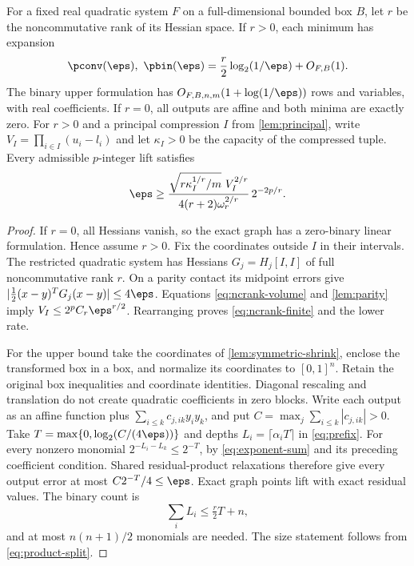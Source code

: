 \begin{theorem}\label{thm:ncrank}
For a fixed real quadratic system $F$ on a full-dimensional bounded
box $B$, let $r$ be the noncommutative rank of its Hessian space.
If $r>0$, each minimum has expansion
\begin{equation}\label{eq:ncrank-law}
 \pconv(\eps),\ \pbin(\eps)
   =\frac r2\log_2(1/\eps)+O_{F,B}(1).
\end{equation}
The binary upper formulation has
$O_{F,B,n,m}(1+\log(1/\eps))$ rows and variables, with real coefficients.
If $r=0$, all outputs are affine and both minima are exactly zero.
For $r>0$ and a principal compression $I$ from \cref{lem:principal}, write
$V_I=\prod_{i\in I}(u_i-l_i)$ and let $\kappa_I>0$ be the capacity of
the compressed tuple. Every admissible $p$-integer lift satisfies
\begin{equation}\label{eq:ncrank-finite}
 \eps\ge
 \frac{\sqrt{r\kappa_I^{1/r}/m}\ V_I^{2/r}}
      {4(r+2)\omega_r^{2/r}}\,2^{-2p/r}.
\end{equation}
\end{theorem}
\begin{proof}
If $r=0$, all Hessians vanish, so the exact graph has a zero-binary
linear formulation. Hence assume $r>0$.
Fix the coordinates outside $I$ in their intervals. The restricted
quadratic system has Hessians $G_j=H_j[I,I]$ of full noncommutative
rank $r$. On a parity contact its midpoint errors give
$|\tfrac12(x-y)^TG_j(x-y)|\le4\eps$. Equations
\eqref{eq:ncrank-volume} and \cref{lem:parity} imply
$V_I\le2^pC_r\eps^{r/2}$. Rearranging proves
\eqref{eq:ncrank-finite} and the lower rate.

For the upper bound take the coordinates of
\cref{lem:symmetric-shrink}, enclose the transformed box in a box,
and normalize its coordinates to $[0,1]^n$. Retain the original box
inequalities and coordinate identities. Diagonal rescaling and
translation do not create quadratic coefficients in zero blocks.
Write each output as an affine function plus
$\sum_{i\le k}c_{j,ik}y_iy_k$, and put
$C=\max_j\sum_{i\le k}|c_{j,ik}|>0$.
Take $T=\max\{0,\log_2(C/(4\eps))\}$ and depths
$L_i=\lceil\alpha_iT\rceil$ in \eqref{eq:prefix}. For every nonzero
monomial $2^{-L_i-L_k}\le2^{-T}$, by \eqref{eq:exponent-sum} and its
preceding coefficient condition. Shared residual-product relaxations
therefore give every output error at most $C2^{-T}/4\le\eps$.
Exact graph points lift with exact residual values. The binary count is
\[
 \sum_iL_i\le\tfrac r2T+n,
\]
and at most $n(n+1)/2$ monomials are needed. The size statement follows
from \eqref{eq:product-split}.
\end{proof}

